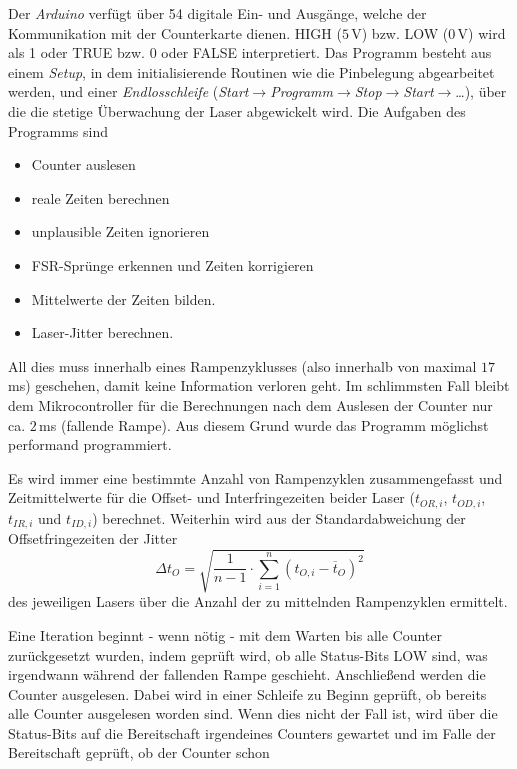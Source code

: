 Der \textit{Arduino} verfügt über 54 digitale Ein- und Ausgänge, welche der
Kommunikation mit der Counterkarte dienen. HIGH ($5\,$V) bzw. LOW ($0\,$V) wird
als 1 oder TRUE bzw. 0 oder FALSE interpretiert. Das Programm besteht aus einem \textit{Setup}, in dem initialisierende Routinen wie die Pinbelegung
abgearbeitet werden, und einer \textit{Endlosschleife}
(\textit{Start}$\rightarrow$\textit{Programm}$\rightarrow$\textit{Stop}$\rightarrow$\textit{Start}$\rightarrow$\ldots),
über die die stetige Überwachung der Laser abgewickelt wird. Die Aufgaben des
Programms sind
\begin{itemize}
	\item Counter auslesen
	\item reale Zeiten berechnen
	\item unplausible Zeiten ignorieren
	\item FSR-Sprünge erkennen und Zeiten korrigieren
	\item Mittelwerte der Zeiten bilden.
	\item Laser-Jitter berechnen.
\end{itemize}
All dies muss innerhalb eines Rampenzyklusses (also innerhalb von maximal
$17\,$ms) geschehen, damit keine Information verloren geht. Im schlimmsten Fall
bleibt dem Mikrocontroller für die Berechnungen nach dem Auslesen der Counter
nur ca. $2\,$ms (fallende Rampe). Aus diesem Grund wurde das Programm möglichst
performand programmiert.\par Es wird immer eine bestimmte Anzahl von Rampenzyklen zusammengefasst und Zeitmittelwerte für die Offset- und Interfringezeiten beider Laser ($t_{OR,i}$,
$t_{OD,i}$, $t_{IR,i}$ und $t_{ID,i}$) berechnet. Weiterhin wird aus der
Standardabweichung der Offsetfringezeiten der Jitter
\begin{equation}\label{eq:jitter_zeit}
	\Delta
	t_O=\sqrt{\frac{1}{n-1}\cdot\sum\limits_{i=1}^{n}\left(t_{O,i}-\overline{t}_O\right)^2}
\end{equation}
des jeweiligen Lasers über die Anzahl der zu mittelnden Rampenzyklen
ermittelt.\par
Eine Iteration beginnt - wenn nötig - mit dem Warten bis alle
Counter zurückgesetzt wurden, indem geprüft wird, ob alle Status-Bits LOW sind, was irgendwann während der fallenden Rampe geschieht.
Anschließend werden die Counter ausgelesen. Dabei wird in einer Schleife zu
Beginn geprüft, ob bereits alle Counter ausgelesen worden sind. Wenn dies nicht
der Fall ist, wird über die Status-Bits auf die Bereitschaft irgendeines
Counters gewartet und im Falle der Bereitschaft geprüft, ob der Counter schon
